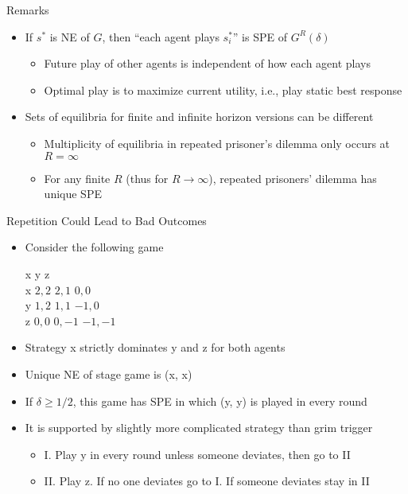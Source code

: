 \documentclass[11pt,aspectratio=169,handout]{beamer}
\begin{document}
  \begin{frame}{Remarks}
   \begin{itemize}
   \setlength{\itemsep}{2em}
    \item If $s^{*}$ is NE of $G$, then ``each agent plays $s_i^{*}$'' is SPE of $G^{R}(\delta)$
    \begin{itemize}
     \item Future play of other agents is independent of how each agent plays
     \item Optimal play is to maximize current utility, i.e., play static best response
    \end{itemize} 
    \item Sets of equilibria for finite and infinite horizon versions can be \alert{different}
    \begin{itemize}
     \item Multiplicity of equilibria in repeated prisoner's dilemma only occurs at $R = \infty$
     \item For any finite $R$ (thus for $R \rightarrow \infty$), repeated prisoners' dilemma has unique SPE
    \end{itemize}
   \end{itemize}
  \end{frame}


  \begin{frame}{Repetition Could Lead to Bad Outcomes}
   \begin{itemize}
   \setlength{\itemsep}{0.5em}
    \item Consider the following game
    \begin{center}\scriptsize
     \hspace{-3.5em}
     \begin{game}{3}{3}
      	\> x 		\> y			\> z			\\
      x	\> $2, 2$	\> $2, 1$	\> $0, 0$	\\
      y	\> $1, 2$	\> $1, 1$	\> $-1, 0$	\\
      z	\> $0, 0$	\> $0, -1$	\> $-1, -1$
     \end{game}
    \end{center}
    \vspace{0.7em}
    \item Strategy x strictly dominates y and z for both agents
    \item Unique NE of stage game is (x, x)
    \item If $\delta \geq 1/2 $, this game has SPE in which (y, y) is played in every round
    \item It is supported by slightly more complicated strategy than grim trigger
    \begin{itemize}
     \item I. Play y in every round unless someone deviates, then go to II
     \item II. Play z. If no one deviates go to I. If someone deviates stay in II
    \end{itemize}
   \end{itemize}
  \end{frame}
  
\end{document}
